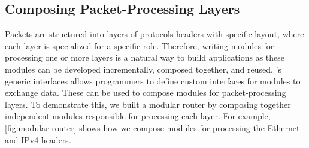 \documentclass[letterpaper,twocolumn,10pt]{article}
\begin{document}
\subsection{Composing Packet-Processing Layers}
\label{subsection:composing-packet-processing-layers}
Packets are structured into layers of protocols headers with 
specific layout, where each layer is specialized for a specific role. 
Therefore, writing modules for processing one or more layers 
is a natural way to build applications as these modules can 
be developed incrementally, composed together, and
reused.
\uarch's generic interfaces allows programmers to define custom
interfaces for modules to exchange data. These can be used to compose
\ulang modules for packet-processing layers. To demonstrate this, we
built a modular router by composing together independent modules
responsible for processing each layer. For example,
\cref{fig:modular-router} shows how we compose modules for processing
the Ethernet and IPv4 headers.
\end{document}
